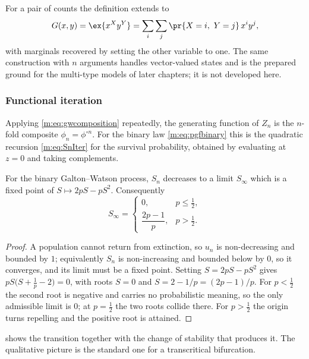 For a pair of counts the definition extends to
\begin{equation}
\label{m:eq:pgfbivariate}
G(x,y) = \ex{x^Xy^Y} = \sum_i\sum_j\pr{X=i,\ Y=j}\,x^iy^j ,
\end{equation}
with marginals recovered by setting the other variable to one. The same
construction with $n$ arguments handles vector-valued states and is the prepared
ground for the multi-type models of later chapters; it is not developed here.

\subsubsection{Functional iteration}
\label{m:sec:iteration}

Applying \cref{m:eq:gwcomposition} repeatedly, the generating function of $Z_n$ is
the $n$-fold composite $\phi_n=\phi^{\circ n}$. For the binary law
\cref{m:eq:pgfbinary} this is the quadratic recursion \cref{m:eq:SnIter} for the
survival probability, obtained by evaluating at $z=0$ and taking complements.

\begin{proposition}
\label{m:sec:extinction}
For the binary Galton--Watson process, $S_n$ decreases to a limit $S_\infty$ which
is a fixed point of $S\mapsto2pS-pS^2$. Consequently
\begin{equation}
\label{m:eq:Sinfty}
S_\infty =
\begin{cases}
0, & p\le\tfrac12,\\[4pt]
\dfrac{2p-1}{p}, & p>\tfrac12 .
\end{cases}
\end{equation}
\end{proposition}

\begin{proof}
A population cannot return from extinction, so $u_n$ is non-decreasing and bounded
by $1$; equivalently $S_n$ is non-increasing and bounded below by $0$, so it
converges, and its limit must be a fixed point. Setting $S=2pS-pS^2$ gives
$pS\bigl(S+\tfrac1p-2\bigr)=0$, with roots $S=0$ and $S=2-1/p=(2p-1)/p$. For
$p<\tfrac12$ the second root is negative and carries no probabilistic meaning, so
the only admissible limit is $0$; at $p=\tfrac12$ the two roots collide there. For
$p>\tfrac12$ the origin turns repelling and the positive root is attained.
\end{proof}

 shows the transition together with the change of
stability that produces it. The qualitative picture is the standard one for a
transcritical bifurcation.

